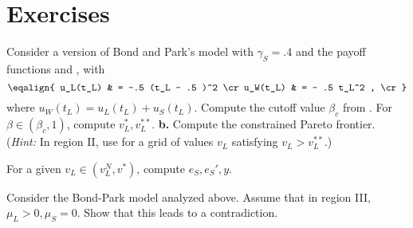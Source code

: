 \showchaptIDfalse
\showsectIDfalse
\section{Exercises}
\showchaptIDtrue
\showsectIDtrue
\medskip

\medskip
{}
\medskip
\noindent Consider a version of Bond and Park's model with
$\gamma_S=.4$ and  the payoff functions   and
, with
$$\eqalign{ u_L(t_L)  &  = -.5 (t_L - .5 )^2  \cr
            u_W(t_L)  &  = - .5 t_L^2 ,    \cr}  $$
where $u_W(t_L) = u_L(t_L) + u_S(t_L)$.
\medskip
{} Compute the cutoff value $\beta_c$ from .
For $\beta \in (\beta_c,1)$, compute
$v_L^*, v_L^{**}$.
\medskip
\noindent
{\bf b.}  Compute the constrained Pareto frontier.  ({\it Hint:}  In
region II, use  for a grid of values
$v_L$ satisfying $v_L > v_L^{**}$.)

\medskip
{}  For a given $v_L \in (v_L^N, v^*)$,
compute $e_S, e_S', y$.


\medskip
{} \quad
\medskip
\noindent Consider the Bond-Park model
analyzed above.   Assume that in region III,  $\mu_L >0, \mu_S =0$.  Show
that this leads to a contradiction.
